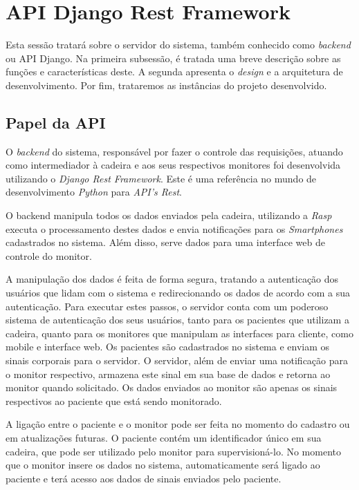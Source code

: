 \section{API Django Rest Framework}
Esta sessão tratará sobre o servidor do sistema, também conhecido como \textit{backend}
ou API Django. Na primeira subsessão, é tratada uma breve descrição sobre as funções
e características deste. A segunda apresenta o \textit{design} e a arquitetura
de desenvolvimento. Por fim, trataremos as instâncias do projeto desenvolvido.


\subsection{Papel da API}
\label{sub:papel_da_api}
O \textit{backend} do sistema, responsável por fazer o controle das requisições,
atuando como intermediador à cadeira e aos seus respectivos monitores
foi desenvolvida utilizando o \textit{Django Rest Framework}. Este é uma
referência no mundo de desenvolvimento \textit{Python} para \textit{API's Rest}.

O backend manipula todos os dados enviados pela cadeira, utilizando a \textit{Rasp}
executa o processamento destes dados e envia notificações para os \textit{Smartphones}
cadastrados no sistema. Além disso, serve dados para uma interface web de controle
do monitor.

A manipulação dos dados é feita de forma segura, tratando a autenticação dos usuários
que lidam com o sistema e redirecionando os dados de acordo com a sua autenticação.
Para executar estes passos, o servidor conta com um poderoso sistema de autenticação
dos seus usuários, tanto para os pacientes que utilizam a cadeira, quanto para os
monitores que manipulam as interfaces para cliente, como mobile e interface web.
Os pacientes são cadastrados no sistema e enviam os sinais corporais para o servidor.
O servidor, além de enviar uma notificação para o monitor respectivo, armazena este
sinal em sua base de dados e retorna ao monitor quando solicitado.
Os dados enviados ao monitor são apenas os sinais respectivos ao paciente que está
sendo monitorado.

A ligação entre o paciente e o monitor pode ser feita no momento do cadastro ou em
atualizações futuras. O paciente contém um identificador único em sua cadeira, que
pode ser utilizado pelo monitor para supervisioná-lo. No momento que o monitor insere
os dados no sistema, automaticamente será ligado ao paciente e terá acesso aos dados
de sinais enviados pelo paciente.

